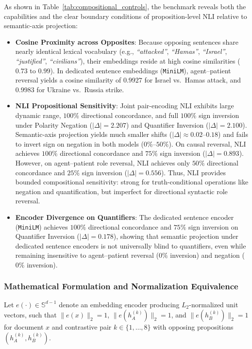 As shown in Table~\ref{tab:compositional_controls}, the benchmark reveals both the capabilities and the clear boundary conditions of proposition-level NLI relative to semantic-axis projection:
\begin{itemize}
    \item \textbf{Cosine Proximity across Opposites}: Because opposing sentences share nearly identical lexical vocabulary (e.g., \emph{``attacked''}, \emph{``Hamas''}, \emph{``Israel''}, \emph{``justified''}, \emph{``civilians''}), their embeddings reside at high cosine similarities ($0.73$ to $0.99$). In dedicated sentence embeddings (\texttt{MiniLM}), agent--patient reversal yields a cosine similarity of $\mathbf{0.9927}$ for Israel vs.\ Hamas attack, and $\mathbf{0.9983}$ for Ukraine vs.\ Russia strike.
    \item \textbf{NLI Propositional Sensitivity}: Joint pair-encoding NLI exhibits large dynamic range, $100\%$ directional concordance, and full $100\%$ sign inversion under Polarity Negation ($|\Delta| = 2.207$) and Quantifier Inversion ($|\Delta| = 2.100$). Semantic-axis projection yields much smaller shifts ($|\Delta| \approx 0.02$--$0.18$) and fails to invert sign on negation in both models ($0\%$--$50\%$). On causal reversal, NLI achieves $100\%$ directional concordance and $75\%$ sign inversion ($|\Delta| = 0.893$). However, on agent--patient role reversal, NLI achieves only $50\%$ directional concordance and $25\%$ sign inversion ($|\Delta| = 0.556$). Thus, NLI provides bounded compositional sensitivity: strong for truth-conditional operations like negation and quantification, but imperfect for directional syntactic role reversal.
    \item \textbf{Encoder Divergence on Quantifiers}: The dedicated sentence encoder (\texttt{MiniLM}) achieves $100\%$ directional concordance and $75\%$ sign inversion on Quantifier Inversion ($|\Delta| = 0.178$), showing that semantic projection under dedicated sentence encoders is not universally blind to quantifiers, even while remaining insensitive to agent--patient reversal ($0\%$ inversion) and negation ($0\%$ inversion).
\end{itemize}

\subsubsection{Mathematical Formulation and Normalization Equivalence}

Let $e(\cdot) \in \mathbb{S}^{d-1}$ denote an embedding encoder producing $L_2$-normalized unit vectors, such that $\|e(x)\|_2 = 1$, $\|e(h_A^{(k)})\|_2 = 1$, and $\|e(h_B^{(k)})\|_2 = 1$ for document $x$ and contrastive pair $k \in \{1, \ldots, 8\}$ with opposing propositions $(h_A^{(k)}, h_B^{(k)})$.

